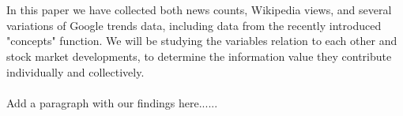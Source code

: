 \\\\
In this paper we have collected both news counts, Wikipedia views, and several variations of Google trends data, including data from the recently introduced "concepts" function. We will be studying the variables relation to each other and stock market developments, to determine the information value they contribute individually and collectively.
\\\\
Add a paragraph with our findings here......
\cleardoublepage
 
